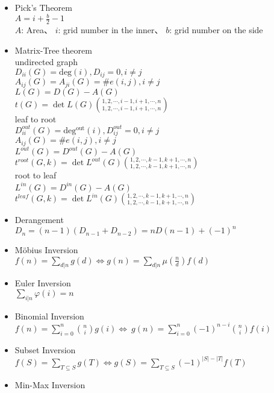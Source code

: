 \begin{itemize}
\setlength\itemsep{0.3em}

  \item Pick’s Theorem\\
    $A = i + \frac{b}{2} - 1$\\
    $A$: Area、 $i$: grid number in the inner、 $b$: grid number on the side
  \item Matrix-Tree theorem\\
    undirected graph\\
    $D_{ii}(G) = \mathrm{deg}(i), D_{ij} = 0, i\neq j$\\  
    $A_{ij}(G)=A_{ji}(G)=\#e(i,j), i\neq j$\\
    $L(G) = D(G) - A(G)$\\
    $t(G) = \det L(G){1,2,\cdots,i-1,i+1,\cdots,n \choose 1,2,\cdots,i-1,i+1,\cdots,n}$\\
    leaf to root\\
    $D^{out}_{ii}(G) = \mathrm{deg^{out}}(i), D^{out}_{ij} = 0, i\neq j$\\
    $A_{ij}(G)=\#e(i,j), i\neq j$\\
    $L^{out}(G) = D^{out}(G) - A(G)$\\
    $t^{root}(G, k) = \det L^{out}(G){1,2,\cdots,k-1,k+1,\cdots,n \choose 1,2,\cdots,k-1,k+1,\cdots,n}$\\
    root to leaf\\
    $L^{in}(G) = D^{in}(G) - A(G)$\\
    $t^{leaf}(G, k) = \det L^{in}(G){1,2,\cdots,k-1,k+1,\cdots,n \choose 1,2,\cdots,k-1,k+1,\cdots,n}$
  \item Derangement\\
    $D_n=(n-1)(D_{n-1}+D_{n-2})=nD(n-1)+(-1)^n$
  \item Möbius Inversion\\
    $f(n)=\sum\limits_{d|n}g(d) \Leftrightarrow g(n)=\sum\limits_{d|n}\mu(\frac{n}{d})f(d)$
  \item Euler Inversion\\
    $\sum\limits_{i|n} \varphi(i)=n$
  \item Binomial Inversion\\
    $f(n)=\sum\limits_{i=0}^n{n \choose i}g(i) \Leftrightarrow
  \ g(n)=\sum\limits_{i=0}^n(-1)^{n-i}{n \choose i}f(i)$
  \item Subset Inversion\\
     $f(S)=\sum_{T\subseteq S}g(T) \Leftrightarrow g(S)=\sum_{T\subseteq S}(-1)^{|S|-|T|}f(T)$
  \item Min-Max Inversion\\

\end{itemize}
